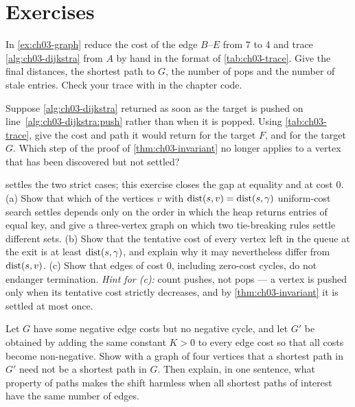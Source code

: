 \section{Exercises}
\label{sec:ch03-exercises}

\begin{exercise}[\difficulty{1}]
\label{exr:ch03-trace}
In \cref{ex:ch03-graph} reduce the cost of the edge $B$--$E$ from 7 to 4 and trace
\cref{alg:ch03-dijkstra} from $A$ by hand in the format of \cref{tab:ch03-trace}. Give the final
distances, the shortest path to $G$, the number of pops and the number of stale entries. Check
your trace with  in the chapter code.
\end{exercise}

\begin{exercise}[\difficulty{1}]
\label{exr:ch03-early}
Suppose \cref{alg:ch03-dijkstra} returned as soon as the target is pushed on
line~\ref{alg:ch03-dijkstra:push} rather than when it is popped. Using \cref{tab:ch03-trace},
give the cost and path it would return for the target $F$, and for the target $G$. Which step of
the proof of \cref{thm:ch03-invariant} no longer applies to a vertex that has been discovered
but not settled?
\end{exercise}

\begin{exercise}[\difficulty{2}]
\label{exr:ch03-monotone}
 settles the two strict cases; this exercise closes the gap at equality and
at cost 0. (a) Show that which of the vertices $v$ with $\operatorname{dist}(s,v)=\operatorname{dist}(s,\gamma)$ uniform-cost
search settles depends only on the order in which the heap returns entries of equal key, and
give a three-vertex graph on which two tie-breaking rules settle different sets.
(b) Show that the tentative cost of every vertex left in the queue at the exit is at least
$\operatorname{dist}(s,\gamma)$, and explain why it may nevertheless differ from $\operatorname{dist}(s,v)$.
(c) Show that edges of cost 0, including zero-cost cycles, do not endanger termination.
\emph{Hint for (c):} count pushes, not pops --- a vertex is pushed only when its tentative cost
strictly decreases, and by \cref{thm:ch03-invariant} it is settled at most once.
\end{exercise}

\begin{exercise}[\difficulty{2}]
\label{exr:ch03-shift}
Let $G$ have some negative edge costs but no negative cycle, and let $G'$ be obtained by adding
the same constant $K>0$ to every edge cost so that all costs become non-negative. Show with a
graph of four vertices that a shortest path in $G'$ need not be a shortest path in $G$. Then
explain, in one sentence, what property of paths makes the shift harmless when all shortest
paths of interest have the same number of edges.
\end{exercise}

